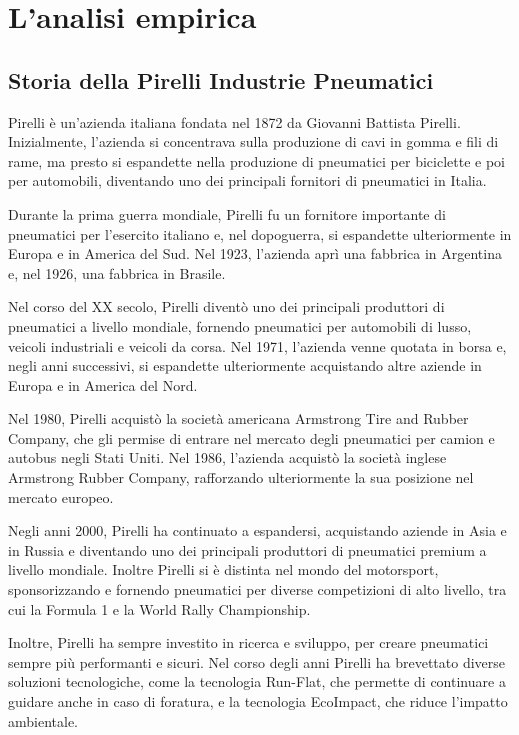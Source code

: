 \chapter{L'analisi empirica}

\section{Storia della Pirelli Industrie Pneumatici}
\label{Storia della Pirelli Industrie Pneumatici}
Pirelli è un'azienda italiana fondata nel 1872 da Giovanni Battista Pirelli. Inizialmente, l'azienda si concentrava sulla produzione di cavi in gomma e fili di rame, ma presto si espandette nella produzione di pneumatici per biciclette e poi per automobili, diventando uno dei principali fornitori di pneumatici in Italia.


Durante la prima guerra mondiale, Pirelli fu un fornitore importante di pneumatici per l'esercito italiano e, nel dopoguerra, si espandette ulteriormente in Europa e in America del Sud. Nel 1923, l'azienda aprì una fabbrica in Argentina e, nel 1926, una fabbrica in Brasile.

Nel corso del XX secolo, Pirelli diventò uno dei principali produttori di pneumatici a livello mondiale, fornendo pneumatici per automobili di lusso, veicoli industriali e veicoli da corsa. Nel 1971, l'azienda venne quotata in borsa e, negli anni successivi, si espandette ulteriormente acquistando altre aziende in Europa e in America del Nord.

Nel 1980, Pirelli acquistò la società americana Armstrong Tire and Rubber Company, che gli permise di entrare nel mercato degli pneumatici per camion e autobus negli Stati Uniti. Nel 1986, l'azienda acquistò la società inglese Armstrong Rubber Company, rafforzando ulteriormente la sua posizione nel mercato europeo.

Negli anni 2000, Pirelli ha continuato a espandersi, acquistando aziende in Asia e in Russia e diventando uno dei principali produttori di pneumatici premium a livello mondiale. Inoltre Pirelli si è distinta nel mondo del motorsport, sponsorizzando e fornendo pneumatici per diverse competizioni di alto livello, tra cui la Formula 1 e la World Rally Championship.

Inoltre, Pirelli ha sempre investito in ricerca e sviluppo, per creare pneumatici sempre più performanti e sicuri. Nel corso degli anni Pirelli ha brevettato diverse soluzioni tecnologiche, come la tecnologia Run-Flat, che permette di continuare a guidare anche in caso di foratura, e la tecnologia EcoImpact, che riduce l'impatto ambientale.

